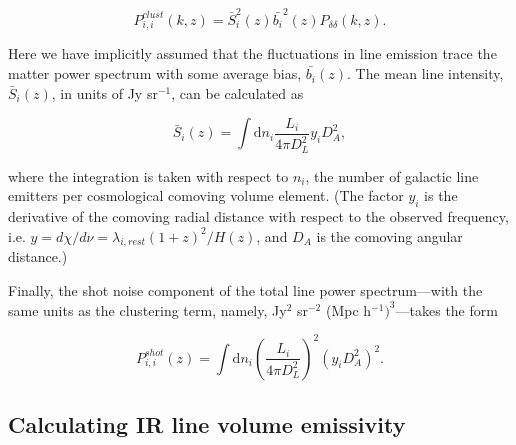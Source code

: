 \documentclass[12pt,preprint]{emulateapj}
\begin{document}
\begin{equation}
 P_{i,i}^{clust}(k, z) = \bar{S}_{i}^2(z) \bar{b_i}^2(z) P_{\delta\delta}(k, z).
 \label{eq:pclust}
 \end{equation}

Here we have implicitly assumed that the fluctuations in line emission trace the matter power spectrum with some average bias, $\bar{b_i}(z)$. The mean line intensity, $\bar{S}_{i}(z)$, in units of Jy sr$^{-1}$, can be calculated as

\begin{equation}
\bar{S}_{i}(z) = \int{\mathrm{d}n_{i} \frac{L_{i}}{4\pi D_L^2}} y_i D_A^2 ,
\end{equation}

where the integration is taken with respect to $n_{i}$, the number of galactic line emitters per cosmological comoving volume element. (The factor $y_i$ is the derivative of the comoving radial distance with respect to the observed frequency, i.e. $y = d\chi/d\nu = \lambda_{i,rest} (1+z)^2/H(z)$, and $D_A$ is the comoving angular distance.)

Finally, the shot noise component of the total line power spectrum---with the same units as the clustering term, namely, Jy$^2$ sr$^{-2}$ (Mpc h$^{-1})^{3}$---takes the form 

\begin{equation}
P_{i,i}^{shot}(z) = \int{\mathrm{d}n_{i} \left( \frac{L_{i}}{4\pi D_L^2} \right)^2 \left( y_i D_A^2 \right)^2}.
 \label{eq:pshot}
\end{equation}

\subsection{Calculating IR line volume emissivity}
\end{document}
